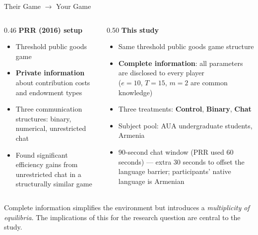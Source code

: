 \documentclass[aspectratio=169,10pt]{beamer}
\newcommand{\cg}[1]{\textcolor{controlgreen}{\textbf{#1}}}
\newcommand{\bo}[1]{\textcolor{binaryorange}{\textbf{#1}}}
\newcommand{\cb}[1]{\textcolor{chatblue}{\textbf{#1}}}
\begin{document}
\begin{frame}{Their Game $\longrightarrow$ Your Game}

\begin{columns}[T]
  \begin{column}{0.46\textwidth}
    \textbf{PRR (2016) setup}
    \begin{itemize}\small
      \item Threshold public goods game
      \item \textbf{Private information} about contribution costs and endowment types
      \item Three communication structures: binary, numerical, unrestricted chat
      \item Found significant efficiency gains from unrestricted chat in a structurally similar game
    \end{itemize}
  \end{column}
  \begin{column}{0.50\textwidth}
    \textbf{This study}
    \begin{itemize}\small
      \item Same threshold public goods game structure
      \item \textbf{Complete information}: all parameters are disclosed to every player\\
            ($e=10$, $T=15$, $m=2$ are common knowledge)
      \item Three treatments: \cg{Control}, \bo{Binary}, \cb{Chat}
      \item Subject pool: AUA undergraduate students, Armenia
      \item 90-second chat window (PRR used 60 seconds) --- extra 30 seconds to offset the
            language barrier; participants' native language is Armenian
    \end{itemize}
  \end{column}
\end{columns}

\vspace{0.4em}
\begin{block}{}
  \small
  Complete information simplifies the environment but introduces a \emph{multiplicity of equilibria}.
  The implications of this for the research question are central to the study.
\end{block}

\end{frame}
\end{document}
